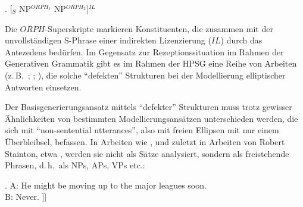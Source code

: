 \ex. \label{ex-tag-unvoll-3}[$_S$ NP$^{ORPH_1}$ NP$^{ORPH_2}$]$^{IL}$ \hfill \citep[277]{Culicover:Jackendoff:05}

Die $ORPH$-Superskripte markieren Konstituenten, die zusammen mit der unvollständigen S-Phrase einer indirekten Lizenzierung ($IL$) durch das Antezedens bedürfen. Im Gegensatz zur Rezeptionssituation im Rahmen der Generativen Grammatik gibt es im Rahmen der HPSG eine Reihe von Arbeiten (z.\,B.\ \citealt{Ginzburg:Sag:01}; \citealt[333f]{Ginzburg:Cooper:04}; \citealt[171ff]{Schlangen:03}), die solche "`defekten"' Strukturen bei der Modellierung elliptischer Antworten einsetzen. 

Der Basisgenerierungsansatz mittels "`defekter"' Strukturen muss trotz gewisser Ähnlichkeiten von bestimmten Modellierungsansätzen unterschieden werden, die sich mit "`non-senten\-tial utterances"', also mit freien Ellipsen mit nur einem Überbleibsel, befassen. In Arbeiten wie \cite{Yanofsky:78}, \cite{Barton:90} und zuletzt in Arbeiten von Robert Stainton, etwa \cite{Stainton:98,Stainton:06}, werden sie nicht als Sätze analysiert, sondern als freistehende Phrasen, d.\,h.\ als NPs, APs, VPs etc.:

\ex. \label{ex-freistehende-phrasen}
A: He might be moving up to the major leagues soon. \\
B: Never. \newline
[$_{ADV''}$ [$_{ADV'}$ [$_{ADV}$ never]]] \\
\citep[60]{Barton:90}
 

